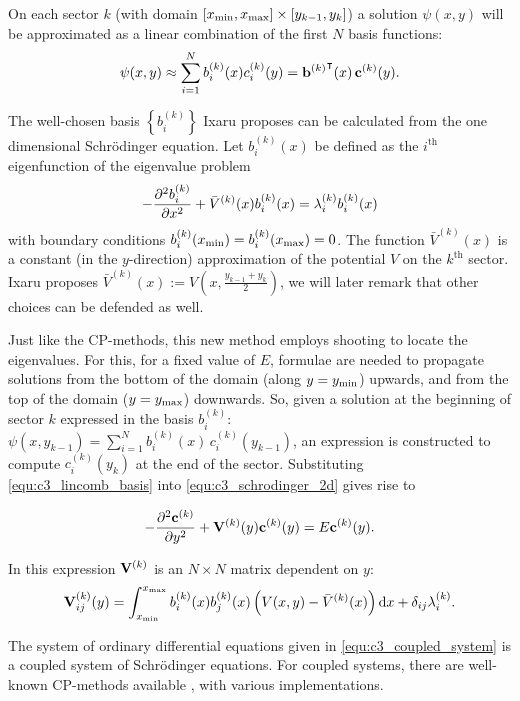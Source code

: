 On each sector $k$ (with domain $[{x_{\text{min}}}, {x_{\text{max}}}]\times[y_{k-1}, y_k]$) a solution $\psi(x, y)$ will be approximated as a linear combination of the first $N$ basis functions:
\begin{equation}\label{equ:c3_lincomb_basis}
    \psi(x, y) \approx \sum_{i=1}^{N} b_i^{(k)}(x) c_i^{(k)}(y) = {\vb{b}^{(k)}}^\intercal(x) \, \vb{c}^{(k)}(y) \text{.}
\end{equation}

The well-chosen basis $\left\{b_i^{(k)}\right\}$ Ixaru proposes can be calculated from the one dimensional Schrödinger equation. Let $b_i^{(k)}(x)$ be defined as the $i^\text{th}$ eigenfunction of the eigenvalue problem
$$
    -\pdv[2]{b_i^{(k)}}{x} + \bar{V}^{(k)}(x)b_i^{(k)}(x) = \lambda_i^{(k)} b_i^{(k)}(x)
$$
with boundary conditions $b_i^{(k)}({x_{\text{min}}}) = b_i^{(k)}({x_{\text{max}}}) = 0$. The function $\bar{V}^{(k)}(x)$ is a constant (in the $y$-direction) approximation of the potential $V$ on the $k^\text{th}$ sector. Ixaru proposes $\bar{V}^{(k)}(x) := V\left(x, \frac{y_{k-1} + y_k}{2}\right)$, we will later remark that other choices can be defended as well.

Just like the CP-methods, this new method employs shooting to locate the eigenvalues. For this, for a fixed value of $E$, formulae are needed to propagate solutions from the bottom of the domain (along $y = {y_{\text{min}}}$) upwards, and from the top of the domain ($y = {y_{\text{max}}}$) downwards. So, given a solution at the beginning of sector $k$ expressed in the basis $b_i^{(k)}$:
$ \psi(x, y_{k-1}) = \sum_{i=1}^{N} b_i^{(k)}(x)\, c_i^{(k)}(y_{k-1}) $, an expression is constructed to compute $c^{(k)}_i(y_k)$ at the end of the sector. Substituting \eqref{equ:c3_lincomb_basis} into \eqref{equ:c3_schrodinger_2d} gives rise to

\begin{equation}\label{equ:c3_coupled_system}
    -\pdv[2]{\vb{c}^{(k)}}{y} + \vb{V}^{(k)}(y) \vb{c}^{(k)}(y) = E \vb{c}^{(k)}(y) \text{.}
\end{equation}

In this expression $\vb{V}^{(k)}$ is an $N\times N$ matrix dependent on $y$:
\begin{equation}\label{equ:c3_v_matrix}
    \vb{V}^{(k)}_{ij}(y) = \int_{{x_{\text{min}}}}^{{x_{\text{max}}}} b_i^{(k)}(x) b_j^{(k)}(x) \left(V(x, y) - \bar{V}^{(k)}(x)\right) \dd x + \delta_{ij} \lambda_i^{(k)} \text{.}
\end{equation}

The system of ordinary differential equations given in \eqref{equ:c3_coupled_system} is a coupled system of Schrö\-dinger equations. For coupled systems, there are well-known CP-methods available \cite{ledoux_numerical_2007a,ixaru_lilix_2002a}, with various implementations.

